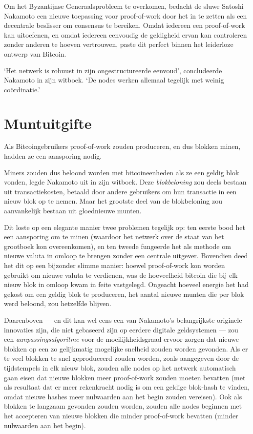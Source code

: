 \documentclass[
  a5paper,
  smalldemyvopaper,11pt,twoside,onecolumn,openright,extrafontsizes,
hidelinks]{memoir}
\begin{document}
Om het Byzantijnse Generaalsprobleem te overkomen, bedacht de sluwe
Satoshi Nakamoto een nieuwe toepassing voor proof-of-work door het in te
zetten als een decentrale beslisser om consensus te bereiken. Omdat
iedereen een proof-of-work kan uitoefenen, en omdat iedereen eenvoudig
de geldigheid ervan kan controleren zonder anderen te hoeven vertrouwen,
paste dit perfect binnen het leiderloze ontwerp van Bitcoin.

`Het netwerk is robuust in zijn ongestructureerde eenvoud', concludeerde
Nakamoto in zijn witboek. `De nodes werken allemaal tegelijk met weinig
coördinatie.'

\section{Muntuitgifte}\label{muntuitgifte}

Als Bitcoingebruikers proof-of-work zouden produceren, en dus blokken
minen, hadden ze een aansporing nodig.

Miners zouden dus beloond worden met bitcoineenheden als ze een geldig
blok vonden, legde Nakamoto uit in zijn witboek. Deze
\emph{blokbeloning} zou deels bestaan uit transactiekosten, betaald door
andere gebruikers om hun transactie in een nieuw blok op te nemen. Maar
het grootste deel van de blokbeloning zou aanvankelijk bestaan uit
gloednieuwe munten.

Dit loste op een elegante manier twee problemen tegelijk op: ten eerste
bood het een aansporing om te minen (waardoor het netwerk over de staat
van het grootboek kon overeenkomen), en ten tweede fungeerde het als
methode om nieuwe valuta in omloop te brengen zonder een centrale
uitgever. Bovendien deed het dit op een bijzonder slimme manier: hoewel
proof-of-work kon worden gebruikt om nieuwe valuta te verdienen, was de
hoeveelheid bitcoin die bij elk nieuw blok in omloop kwam in feite
vastgelegd. Ongeacht hoeveel energie het had gekost om een geldig blok
te produceren, het aantal nieuwe munten die per blok werd beloond, zou
hetzelfde blijven.

Daarenboven --- en dit kan wel eens een van Nakamoto's belangrijkste
originele innovaties zijn, die niet gebaseerd zijn op eerdere digitale
geldsystemen --- zou een \emph{aanpassingsalgoritme} voor de
moeilijkheidsgraad ervoor zorgen dat nieuwe blokken op een zo
gelijkmatig mogelijke snelheid zouden worden gevonden. Als er te veel
blokken te snel geproduceerd zouden worden, zoals aangegeven door de
tijdstempels in elk nieuw blok, zouden alle nodes op het netwerk
automatisch gaan eisen dat nieuwe blokken meer proof-of-work zouden
moeten bevatten (met als resultaat dat er meer rekenkracht nodig is om
een geldige blok-hash te vinden, omdat nieuwe hashes meer nulwaarden aan
het begin zouden vereisen). Ook als blokken te langzaam gevonden zouden
worden, zouden alle nodes beginnen met het accepteren van nieuwe blokken
die minder proof-of-work bevatten (minder nulwaarden aan het begin).
\end{document}
